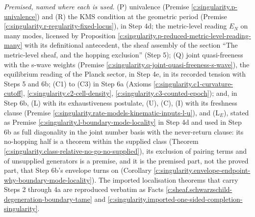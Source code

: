\documentclass[11pt]{article}
\theoremstyle{definition}
\theoremstyle{plain}
\providecommand{\EN}{}\renewcommand{\EN}{E_{N}}
\begin{document}
\emph{Premised, named where each is used.} (P) univalence (Premise \ref{c:singularity.p-univalence}) and (R) the KMS condition at the geometric period (Premise \ref{c:singularity.r-regularity-fixed-locus}), in Step 4d; the metric-level reading $\EN$ on many modes, licensed by Proposition \ref{c:singularity.p-reduced-metric-level-reading-many} with its definitional antecedent, the sheaf assembly of the section ``The metric-level sheaf, and the hopping exclusion'' (Step 5); (Q) joint quasi-freeness with the s-wave weights (Premise \ref{c:singularity.q-joint-quasi-freeness-s-wave}), the equilibrium reading of the Planck sector, in Step 4e, in its recorded tension with Steps 5 and 6b; (C1) to (C3) in Step 6a (Axioms \ref{c:singularity.c1-curvature-cutoff}, \ref{c:singularity.c2-cell-density}, \ref{c:singularity.c3-counted-epoch}); and, in Step 6b, (L) with its exhaustiveness postulate, (U), (C), (I) with its freshness clause (Premise \ref{c:singularity.rate-models-kinematic-inputs-l-u}), and (L$_E$), stated as Premise \ref{c:singularity.l-boundary-mode-locality} in Step 4d and used in Step 6b as full diagonality in the joint number basis with the never-return clause: its no-hopping half is a theorem within the supplied class (Theorem \ref{c:singularity.class-relative-no-go-no-supplied}), its exclusion of pairing terms and of unsupplied generators is a premise, and it is the premised part, not the proved part, that Step 6b's envelope turns on (Corollary \ref{c:singularity.envelope-endpoint-why-boundary-mode-locality}). The imported localisation theorems that carry Steps 2 through 4a are reproduced verbatim as Facts \ref{c:sheaf.schwarzschild-degeneration-boundary-tame} and \ref{c:singularity.imported-one-sided-completion-singularity}.
\end{document}
